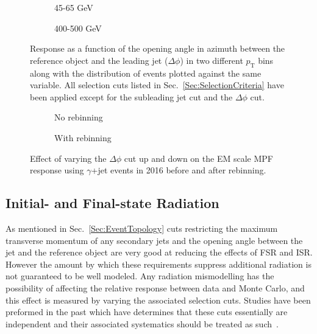 \begin{figure}[!ht]
  \centering
  \begin{subfigure}{.5\textwidth}
    \centering
    \caption{45-65 GeV}
  \end{subfigure}%
  \begin{subfigure}{.5\textwidth}
    \centering
    \caption{400-500 GeV}
  \end{subfigure}
  \caption[Response as a function of $\Delta\phi$ for two $p_{\mathrm{T}}$ bins]
  {\small Response as a function of the opening angle in azimuth between the reference object and the leading jet ($\Delta\phi$) in two different $p_{\mathrm T}$ bins along with the distribution of events plotted against the same variable.  All selection cuts listed in Sec.~\ref{Sec:SelectionCriteria} have been applied except for the subleading jet cut and the $\Delta\phi$ cut.  }
  \label{Fig:RespVsdPhiGJetEM2016}
\end{figure}

\begin{figure}[!ht]
  \centering
  \begin{subfigure}{.5\textwidth}
    \centering
    \caption{No rebinning}
  \end{subfigure}%
  \begin{subfigure}{.5\textwidth}  \centering
  \caption{With rebinning}
  \end{subfigure}
  \caption{Effect of varying the $\Delta\phi$ cut up and down on the EM scale MPF response using $\gamma$+jet events in 2016 before and after rebinning. }
  \label{Fig:dPhiGJetEM2016}
\end{figure}

\subsection{Initial- and Final-state Radiation}
As mentioned in Sec.~\ref{Sec:EventTopology} cuts restricting the maximum transverse momentum of any secondary jets and the opening angle between the jet and the reference object are very good at reducing the effects of FSR and ISR.
However the amount by which these requirements suppress additional radiation is not guaranteed to be well modeled.
Any radiation mismodelling has the possibility of affecting the relative response between data and Monte Carlo, and this effect is measured by varying the associated selection cuts.  
Studies have been preformed in the past which have determines that these cuts essentially are independent and their associated systematics should be treated as such~\cite{ATLAS-CONF-2011-031}.  

